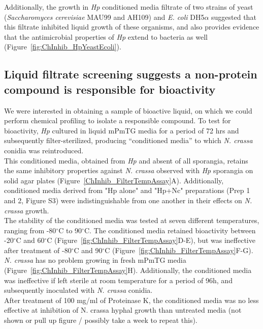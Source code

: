 \indent Additionally, the growth in \textit{Hp} conditioned media filtrate of two strains of yeast (\textit{Saccharomyces cerevisiae} MAU99 and AH109) and \textit{E. coli} DH5$\alpha$ suggested that this filtrate inhibited liquid growth of these organisms, and also provides evidence that the antimicrobial properties of \textit{Hp} extend to bacteria as well (Figure~\ref{fig:ChInhib_HpYeastEcoli}).\\
\subsection*{Liquid filtrate screening suggests a non-protein compound is responsible for bioactivity}
We were interested in obtaining a sample of bioactive liquid, on which we could perform chemical profiling to isolate a responsible compound. To test for bioactivity, \textit{Hp} cultured in liquid mPmTG media for a period of 72 hrs and subsequently filter-sterilized, producing “conditioned media” to which \textit{N. crassa} conidia was reintroduced. \\
\indent This conditioned media, obtained from \textit{Hp} and absent of all sporangia, retains the same inhibitory properties against \textit{N. crassa} observed with \textit{Hp} sporangia on solid agar plates (Figure~\ref{ChInhib_FilterTempAssay}A). Additionally, conditioned media derived from "Hp alone" and "Hp+Nc" preparations (Prep 1 and 2, Figure S3) were indistinguishable from one another in their effects on \textit{N. crassa} growth. \\
\indent The stability of the conditioned media was tested at seven different temperatures, ranging from -80$^{\circ}$C to 90$^{\circ}$C. The conditioned media retained bioactivity between -20$^{\circ}$C and 60$^{\circ}$C (Figure~\ref{fig:ChInhib_FilterTempAssay}D-E), but was ineffective after treatment of -80$^{\circ}$C and 90$^{\circ}$C (Figure~\ref{fig:ChInhib_FilterTempAssay}F-G). \textit{N. crassa} has no problem growing in fresh mPmTG media (Figure~\ref{fig:ChInhib_FilterTempAssay}H). Additionally, the conditioned media was ineffective if left sterile at room temperature for a period of 96h, and subsequently inoculated with \textit{N. crassa} conidia.\\
\indent After treatment of 100 mg/ml of Proteinase K, the conditioned media was no less effective at inhibition of N. crassa hyphal growth than untreated media (not shown or pull up figure / possibly take a week to repeat this).\\
